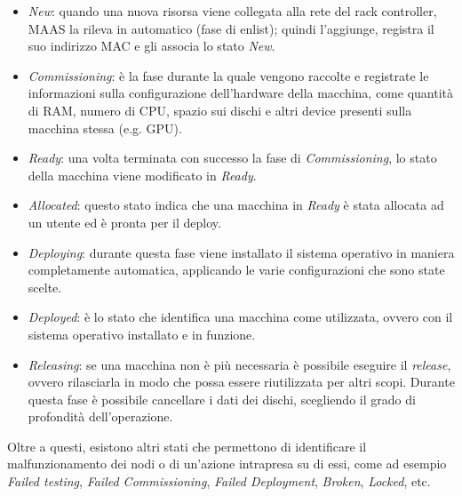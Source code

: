 \begin{itemize}
    \item \emph{New}:
    quando una nuova risorsa viene collegata alla rete del rack controller, MAAS la rileva in automatico (fase di enlist);
    quindi l'aggiunge, registra il suo indirizzo MAC e gli associa lo stato \emph{New}.

    \item \emph{Commissioning}: è la fase durante la quale vengono raccolte e registrate le informazioni sulla configurazione dell'hardware della macchina, come quantità di RAM, numero di CPU, spazio sui dischi e altri device presenti sulla macchina stessa (e.g. GPU).

    \item \emph{Ready}: una volta terminata con successo la fase di \emph{Commissioning}, lo stato della macchina viene modificato in \emph{Ready}.

    \item \emph{Allocated}: questo stato indica che una macchina in \emph{Ready} è stata allocata ad un utente ed è pronta per il deploy.

    \item \emph{Deploying}: durante questa fase viene installato il sistema operativo in maniera completamente automatica, applicando le varie configurazioni che sono state scelte.

    \item \emph{Deployed}: è lo stato che identifica una macchina come utilizzata, ovvero con il sistema operativo installato e in funzione.

    \item \emph{Releasing}: se una macchina non è più necessaria è possibile eseguire il \textit{release}, ovvero rilasciarla in modo che possa essere riutilizzata per altri scopi. 
    Durante questa fase è possibile cancellare i dati dei dischi, scegliendo il grado di profondità dell'operazione.
\end{itemize}
% 
Oltre a questi, esistono altri stati che permettono di identificare il malfunzionamento dei nodi o di un’azione intrapresa su di essi, come ad esempio \emph{Failed testing}, \emph{Failed Commissioning}, \emph{Failed Deployment}, \emph{Broken}, \emph{Locked}, etc.




